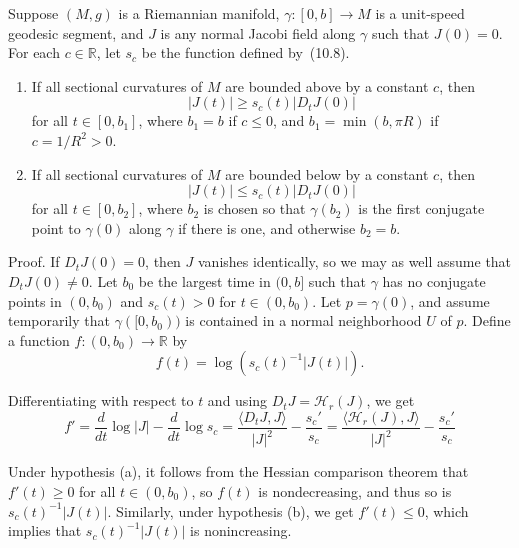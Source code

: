 \begin{theorem}
\label{thm:jacobi-field-comparison}

Suppose $(M,g)$ is a Riemannian manifold, $\gamma : [0,b] \to M$ is a unit-speed geodesic segment, and $J$ is any normal Jacobi field along $\gamma$ such that $J(0) = 0$. For each $c \in \mathbb{R}$, let $s_c$ be the function defined by~(10.8).

\begin{enumerate}
\item[(a)] If all sectional curvatures of $M$ are bounded above by a constant $c$, then
\begin{equation*}
|J(t)| \geq s_c(t)|D_t J(0)| \tag{11.21}
\end{equation*}
for all $t \in [0, b_1]$, where $b_1 = b$ if $c \leq 0$, and $b_1 = \min(b, \pi R)$ if $c = 1/R^2 > 0$.

\item[(b)] If all sectional curvatures of $M$ are bounded below by a constant $c$, then
\begin{equation*}
|J(t)| \leq s_c(t)|D_t J(0)| \tag{11.22}
\end{equation*}
for all $t \in [0, b_2]$, where $b_2$ is chosen so that $\gamma(b_2)$ is the first conjugate point to $\gamma(0)$ along $\gamma$ if there is one, and otherwise $b_2 = b$.
\end{enumerate}
\end{theorem}

Proof. If $D_t J(0) = 0$, then $J$ vanishes identically, so we may as well assume that $D_t J(0) \neq 0$. Let $b_0$ be the largest time in $(0,b]$ such that $\gamma$ has no conjugate points in $(0, b_0)$ and $s_c(t) > 0$ for $t \in (0, b_0)$. Let $p = \gamma(0)$, and assume temporarily that $\gamma([0, b_0))$ is contained in a normal neighborhood $U$ of $p$. Define a function $f : (0, b_0) \to \mathbb{R}$ by
$$f(t) = \log(s_c(t)^{-1}|J(t)|).$$

Differentiating with respect to $t$ and using $D_t J = \mathcal{H}_r(J)$, we get
$$f' = \frac{d}{dt}\log|J| - \frac{d}{dt}\log s_c = \frac{\langle D_t J, J \rangle}{|J|^2} - \frac{s_c'}{s_c} = \frac{\langle \mathcal{H}_r(J), J \rangle}{|J|^2} - \frac{s_c'}{s_c}$$

Under hypothesis (a), it follows from the Hessian comparison theorem that $f'(t) \geq 0$ for all $t \in (0, b_0)$, so $f(t)$ is nondecreasing, and thus so is $s_c(t)^{-1}|J(t)|$. Similarly, under hypothesis (b), we get $f'(t) \leq 0$, which implies that $s_c(t)^{-1}|J(t)|$ is nonincreasing.


